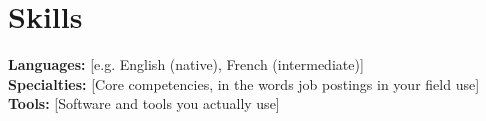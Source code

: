 \documentclass[letterpaper,11pt]{article}
\begin{document}
\section{Skills}
 \begin{itemize}[leftmargin=0.15in, label={}]
    \small{\item{
     \textbf{Languages:} [e.g. English (native), French (intermediate)] \\
     \textbf{Specialties:} [Core competencies, in the words job postings in your field use] \\
     \textbf{Tools:} [Software and tools you actually use]
    }}
 \end{itemize}
\end{document}
